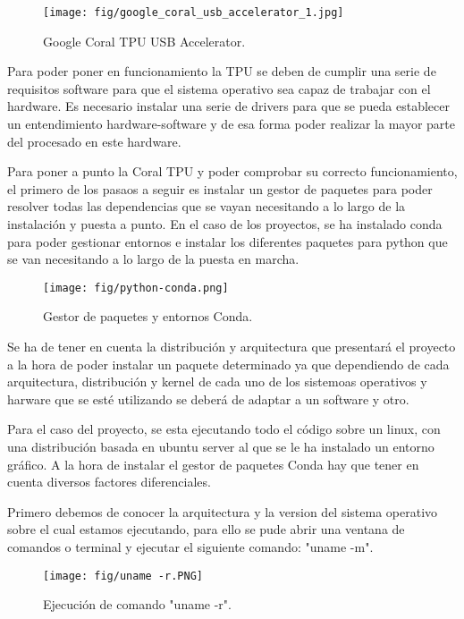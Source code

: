 \begin{figure}[h]
    \centering
    \texttt{[image: fig/google\_coral\_usb\_accelerator\_1.jpg]}
    \caption{Google Coral TPU USB Accelerator.}
    \label{fig:mesh1}
\end{figure}

Para poder poner en funcionamiento la TPU se deben de cumplir una serie de requisitos software para que el sistema operativo sea capaz de trabajar con el hardware. Es necesario instalar una serie de drivers para que se pueda establecer un entendimiento hardware-software y de esa forma poder realizar la mayor parte del procesado en este hardware.

Para poner a punto la Coral TPU y poder comprobar su correcto funcionamiento, el primero de los pasaos a seguir es instalar un gestor de paquetes para poder resolver todas las dependencias que se vayan necesitando a lo largo de la instalación y puesta a punto. En el caso de los proyectos, se ha instalado conda para poder gestionar entornos e instalar los diferentes paquetes para python que se van necesitando a lo largo de la puesta en marcha. 

\begin{figure}[h]
    \centering
    \texttt{[image: fig/python-conda.png]}
    \caption{Gestor de paquetes y entornos Conda.}
    \label{fig:mesh1}
\end{figure}

Se ha de tener en cuenta la distribución y arquitectura que presentará el proyecto a la hora de poder instalar un paquete determinado ya que dependiendo de cada arquitectura, distribución y kernel de cada uno de los sistemoas operativos y harware que se esté utilizando se deberá de adaptar a un software y otro.

Para el caso del proyecto, se esta ejecutando todo el código sobre un linux, con una distribución basada en ubuntu server al que se le ha instalado un entorno gráfico. A la hora de instalar el gestor de paquetes Conda hay que tener en cuenta diversos factores diferenciales.

Primero debemos de conocer la arquitectura y la version del sistema operativo sobre el cual estamos ejecutando, para ello se pude abrir una ventana de comandos o terminal y ejecutar el siguiente comando: "uname -m".

\begin{figure}[h]
    \centering
    \texttt{[image: fig/uname -r.PNG]}
    \caption{Ejecución de comando "uname -r".}
    \label{fig:mesh1}
\end{figure}

